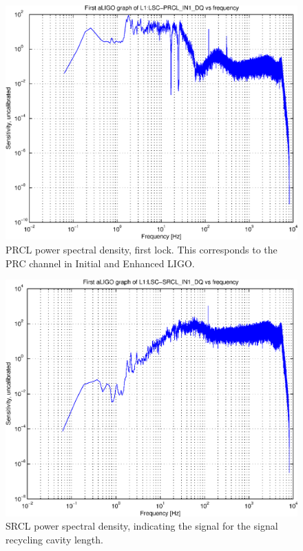 \begin{figure}
\begin{center}
\includegraphics[width=0.4\paperwidth,height=0.3\paperheight]{aLIGOfirstLockPRCL.eps}
\caption{
PRCL power spectral density, first lock. This corresponds to the PRC channel in Initial and Enhanced LIGO.
}
\end{center}
\end{figure}
\begin{figure}
\begin{center}
\includegraphics[width=0.4\paperwidth,height=0.3\paperheight]{aLIGOfirstLockSRCL.eps}
\caption{
SRCL power spectral density, indicating the signal for the signal recycling cavity length.
}
\end{center}
\end{figure}

